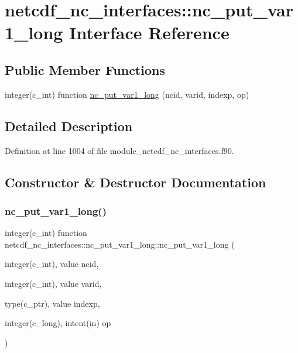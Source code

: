 \hypertarget{interfacenetcdf__nc__interfaces_1_1nc__put__var1__long}{}\section{netcdf\+\_\+nc\+\_\+interfaces\+:\+:nc\+\_\+put\+\_\+var1\+\_\+long Interface Reference}
\label{interfacenetcdf__nc__interfaces_1_1nc__put__var1__long}
\subsection*{Public Member Functions}
\begin{DoxyCompactItemize}
\item 
integer(c\+\_\+int) function \hyperlink{interfacenetcdf__nc__interfaces_1_1nc__put__var1__long_a33f09b8a72d72da19212398cf06570d5}{nc\+\_\+put\+\_\+var1\+\_\+long} (ncid, varid, indexp, op)
\end{DoxyCompactItemize}


\subsection{Detailed Description}


Definition at line 1004 of file module\+\_\+netcdf\+\_\+nc\+\_\+interfaces.\+f90.



\subsection{Constructor \& Destructor Documentation}
\mbox{\label{interfacenetcdf__nc__interfaces_1_1nc__put__var1__long_a33f09b8a72d72da19212398cf06570d5}} 
\subsubsection{\texorpdfstring{nc\+\_\+put\+\_\+var1\+\_\+long()}{nc\_put\_var1\_long()}}
{\footnotesize\ttfamily integer(c\+\_\+int) function netcdf\+\_\+nc\+\_\+interfaces\+::nc\+\_\+put\+\_\+var1\+\_\+long\+::nc\+\_\+put\+\_\+var1\+\_\+long (\begin{DoxyParamCaption}\item[{integer(c\+\_\+int), value}]{ncid,  }\item[{integer(c\+\_\+int), value}]{varid,  }\item[{type(c\+\_\+ptr), value}]{indexp,  }\item[{integer(c\+\_\+long), intent(in)}]{op }\end{DoxyParamCaption})}



